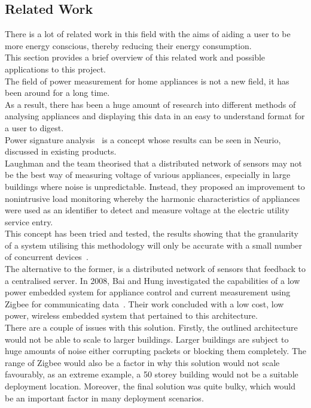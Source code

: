 \documentclass[draft,preprint,12pt,3p]{elsarticle}
\begin{document}
\subsection{Related Work}
There is a lot of related work in this field with the aims of aiding a user to be more energy conscious, thereby reducing their energy consumption.\\
This section provides a brief overview of this related work and possible applications to this project.\\[5pt]
The field of power measurement for home appliances is not a new field, it has been around for a long time.\\ As a result, there has been a huge amount of research into different methods of analysing appliances and displaying this data in an easy to understand format for a user to digest.\\
Power signature analysis~\cite{laughman2003power} is a concept whose results can be seen in Neurio, discussed in existing products.\\ 
Laughman and the team theorised that a distributed network of sensors may not be the best way of measuring voltage of various appliances, especially in large buildings where noise is unpredictable. Instead, they proposed an improvement to nonintrusive load monitoring whereby the harmonic characteristics of appliances were used as an identifier to detect and measure voltage at the electric utility service entry.\\
This concept has been tried and tested, the results showing that the granularity of a system utilising this methodology will only be accurate with a small number of concurrent devices~\cite{liang2010load}.\\
The alternative to the former, is a distributed network of sensors that feedback to a centralised server. In 2008, Bai and Hung investigated the capabilities of a low power embedded system for appliance control and current measurement using Zigbee for communicating data~\cite{bai2008remote}. Their work concluded with a low cost, low power, wireless embedded system that pertained to this architecture.\\
There are a couple of issues with this solution. Firstly, the outlined architecture would not be able to scale to larger buildings. Larger buildings are subject to huge amounts of noise either corrupting packets or blocking them completely. The range of Zigbee would also be a factor in why this solution would not scale favourably, as an extreme example, a 50 storey building would not be a suitable deployment location. Moreover, the final solution was quite bulky, which would be an important factor in many deployment scenarios.\\ 
\end{document}
